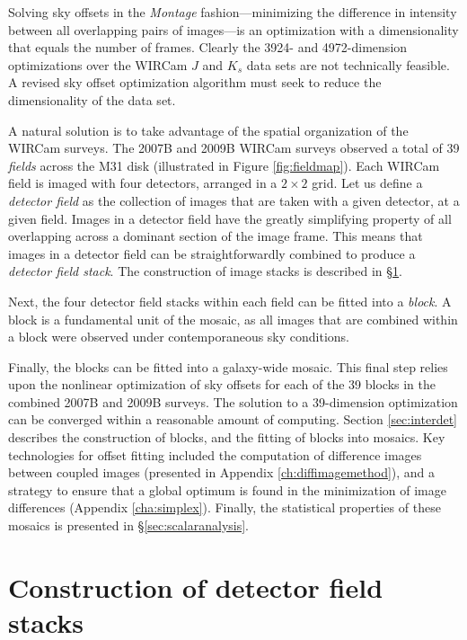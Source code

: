 \documentclass[iop]{emulateapj}
\newcommand{\sw}[1]{\textit{#1}} %
\begin{document}
Solving sky offsets in the \sw{Montage} fashion---minimizing the difference in intensity between all overlapping pairs of images---is an optimization with a dimensionality that equals the number of frames. Clearly the 3924- and 4972-dimension optimizations over the WIRCam $J$ and $K_s$ data sets are not technically feasible. A revised sky offset optimization algorithm must seek to reduce the dimensionality of the data set.

A natural solution is to take advantage of the spatial organization of the WIRCam surveys. The 2007B and 2009B WIRCam surveys observed a total of 39 \emph{fields} across the M31 disk (illustrated in Figure \ref{fig:fieldmap}). Each WIRCam field is imaged with four detectors, arranged in a $2\times 2$ grid. Let us define a \emph{detector field} as the collection of images that are taken with a given detector, at a given field. Images in a detector field have the greatly simplifying property of all overlapping across a dominant section of the image frame. This means that images in a detector field can be straightforwardly combined to produce a \emph{detector field stack}. The construction of image stacks is described in \S\ref{sec:intradet}.

Next, the four detector field stacks within each field can be fitted into a \emph{block}. A block is a fundamental unit of the mosaic, as all images that are combined within a block were observed under contemporaneous sky conditions.

Finally, the blocks can be fitted into a galaxy-wide mosaic. This final step relies upon the nonlinear optimization of sky offsets for each of the 39 blocks in the combined 2007B and 2009B surveys. The solution to a 39-dimension optimization can be converged within a reasonable amount of computing. Section \ref{sec:interdet} describes the construction of blocks, and the fitting of blocks into mosaics. Key technologies for offset fitting included the computation of difference images between coupled images (presented in Appendix \ref{ch:diffimagemethod}), and a strategy to ensure that a global optimum is found in the minimization of image differences (Appendix \ref{cha:simplex}). Finally, the statistical properties of these mosaics is presented in \S\ref{sec:scalaranalysis}.

\section{Construction of detector field stacks}
\label{sec:intradet}
\end{document}
